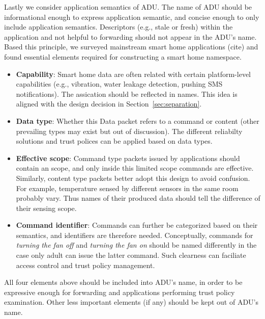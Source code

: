 Lastly we consider application semantics of ADU. 
The name of ADU should be informational enough to express application semantic, and concise enough to only include application semantics.
Descriptors (e.g., stale or fresh) within the application and not helpful to forwarding should not appear in the ADU's name.
Based this principle, we surveyed mainstream smart home applications (cite) and found essential elements required for constructing a smart home namespace.
\begin{itemize}
    \item \textbf{Capability}: Smart home data are often related with certain platform-level capabilities (e.g., vibration, water leakage detection, pushing SMS notifications).
          The assication should be reflected in names. This idea is aligned with the design decision in Section~\ref{sec:separation}.
    \item \textbf{Data type}: Whether this Data packet refers to a command or content (other prevailing types may exist but out of discussion). 
          The different reliabilty solutions and trust polices can be applied based on data types.
    \item \textbf{Effective scope}: Command type packets issued by applications should contain an scope, and only inside this limited scope commands are effective.
          Similarly, content type packets better adopt this design to avoid confusion. 
          For example, temperature sensed by different sensors in the same room probably vary. 
          Thus names of their produced data should tell the difference of their sensing scope.
    \item \textbf{Command identifier}: Commands can further be categorized based on their semantics, and identifiers are therefore needed.
          Conceptually, commands for \textit{turning the fan off} and \textit{turning the fan on} should be named differently in the case only adult can issue the latter command.
          Such clearness can faciliate access control and trust policy management. 
\end{itemize}
All four elements above should be included into ADU's name, in order to be expressive enough for forwarding and applications performing trust policy examination.
Other less important elements (if any) should be kept out of ADU's name.


